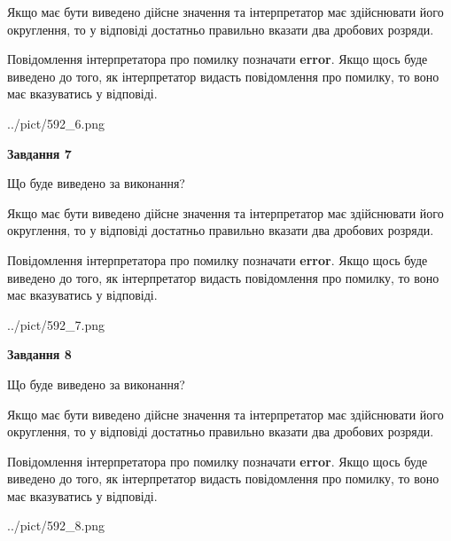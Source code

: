 \documentclass[12pt, ukrainian]{article}
\begin{document}
{\begin {Large}
Якщо має бути виведено дійсне значення та інтерпретатор має здійснювати його округлення, 
то у відповіді достатньо правильно вказати два дробових розряди.

Повідомлення інтерпретатора про помилку позначати \textbf{error}.
Якщо щось буде виведено до того, як інтерпретатор видасть повідомлення про помилку, 
то воно має вказуватись у відповіді. \par

\begin{center}
	{../pict/592_6.png}
\end{center}
\newpage

{\begin {center}\textbf{Завдання 7}\end {center}}\par
Що буде виведено за виконання? \par

Якщо має бути виведено дійсне значення та інтерпретатор має здійснювати його округлення, 
то у відповіді достатньо правильно вказати два дробових розряди.

Повідомлення інтерпретатора про помилку позначати \textbf{error}.
Якщо щось буде виведено до того, як інтерпретатор видасть повідомлення про помилку, 
то воно має вказуватись у відповіді. \par

\begin{center}
	{../pict/592_7.png}
\end{center}
\newpage

{\begin {center}\textbf{Завдання 8}\end {center}}\par
Що буде виведено за виконання? \par

Якщо має бути виведено дійсне значення та інтерпретатор має здійснювати його округлення, 
то у відповіді достатньо правильно вказати два дробових розряди.

Повідомлення інтерпретатора про помилку позначати \textbf{error}.
Якщо щось буде виведено до того, як інтерпретатор видасть повідомлення про помилку, 
то воно має вказуватись у відповіді. \par

\begin{center}
	{../pict/592_8.png}
\end{center}
\newpage


\end{Large}}
\end{document}

